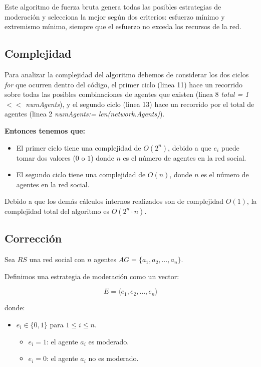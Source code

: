 \documentclass[letterpaper,10pt]{article}
\begin{document}
Este algoritmo de fuerza bruta genera todas las posibles estrategias de moderación y selecciona la mejor según dos criterios: esfuerzo mínimo y extremismo mínimo, siempre que el esfuerzo no exceda los recursos de la red.


\subsection{Complejidad}
\label{subsec:complejidad_fuerza_bruta}
Para analizar la complejidad del algoritmo debemos de considerar los dos ciclos \textit{for} que ocurren dentro del código, el primer ciclo (linea 11) hace un recorrido sobre todas las posibles combinaciones de agentes que existen (linea 8 \textit{total = 1 $<<$ numAgents}), y el segundo ciclo (linea 13) hace un recorrido por el total de agentes (linea 2 \textit{numAgents:= len(network.Agents)}).

\textbf{Entonces tenemos que:}
\begin{itemize}
  \item El primer ciclo tiene una complejidad de \(O(2^n)\), debido a que $e_i$ puede tomar dos valores ($0$ o $1$) donde \(n\) es el número de agentes en la red social.
  \item El segundo ciclo tiene una complejidad de \(O(n)\), donde \(n\) es el número de agentes en la red social.
\end{itemize}
Debido a que los demás cálculos internos realizados son de complejidad \(O(1)\), la complejidad total del algoritmo es \(O(2^n \cdot n)\).
\subsection{Corrección}
\label{subsec:correccion_fuerza_bruta}
Sea $RS$ una red social con $n$ agentes $AG = \{a_1, a_2, \dots, a_n\}$.

Definimos una estrategia de moderación como un vector:

\[
E = \langle e_1, e_2, \dots, e_n \rangle
\]

donde:
\begin{itemize}
  \item $e_i \in \{0, 1\}$ para $1 \leq i \leq n$.
  \begin{itemize}
    \item $e_i = 1$: el agente $a_i$ es moderado.
    \item $e_i = 0$: el agente $a_i$ no es moderado.
  \end{itemize}
\end{itemize}
\end{document}
